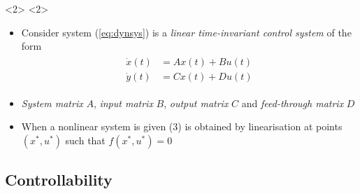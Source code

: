 \begin{frame}
\begin{onlyenv}<2>
<2>
\begin{itemize}
	\item Consider system (\ref{eq:dynsys}) is a \emph{linear time-invariant control system} of the form
	\begin{align}\label{eq:LTI}
	\begin{aligned}
		\dot{x}(t) &= Ax(t) + Bu(t)\\
		\dot{y}(t) &= Cx(t) + Du(t)
	\end{aligned}
	\end{align}
	\item \emph{System matrix} $A$, \emph{input matrix} $B$, \emph{output matrix} $C$ and \emph{feed-through matrix} $D$
	\item When a nonlinear system is given (3) is obtained by linearisation at points $(x^*,u^*)$ such that $f(x^*,u^*) = 0$
\end{itemize}
\end{onlyenv}

\end{frame}

\subsection{Controllability}

